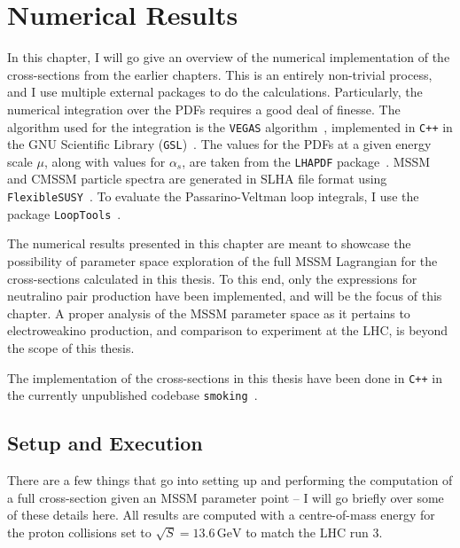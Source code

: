 \documentclass[../main.tex]{subfiles}
\begin{document}
\chapter{Numerical Results}
\label{chap:results}
In this chapter, I will go give an overview of the numerical implementation of the cross-sections from the earlier chapters.
This is an entirely non-trivial process, and I use multiple external packages to do the calculations.
Particularly, the numerical integration over the PDFs requires a good deal of finesse.
The algorithm used for the integration is the \verb|VEGAS| algorithm~\cite{Vegas1}, implemented in \verb|C++| in the GNU Scientific Library (\verb|GSL|)~\cite{GSL}.
The values for the PDFs at a given energy scale \(\mu\), along with values for \(\alpha_s\), are taken from the \verb|LHAPDF| package~\cite{LHAPDF}.
MSSM and CMSSM particle spectra are generated in SLHA file format using \verb|FlexibleSUSY|~\cite{FlexibleSUSY1,FlexibleSUSY2}.
To evaluate the Passarino-Veltman loop integrals, I use the package \verb|LoopTools|~\cite{LoopTools}.
\medskip

The numerical results presented in this chapter are meant to showcase the possibility of parameter space exploration of the full MSSM Lagrangian for the cross-sections calculated in this thesis.
To this end, only the expressions for neutralino pair production have been implemented, and will be the focus of this chapter.
A proper analysis of the MSSM parameter space as it pertains to electroweakino production, and comparison to experiment at the LHC, is beyond the scope of this thesis.

The implementation of the cross-sections in this thesis have been done in \verb|C++| in the currently unpublished codebase \verb|smoking|~\cite{smoking}.



\section{Setup and Execution}
There are a few things that go into setting up and performing the computation of a full cross-section given an MSSM parameter point -- I will go briefly over some of these details here.
All results are computed with a centre-of-mass energy for the proton collisions set to \(\sqrt{S} = 13.6\,\text{GeV}\) to match the LHC run 3.
\end{document}
